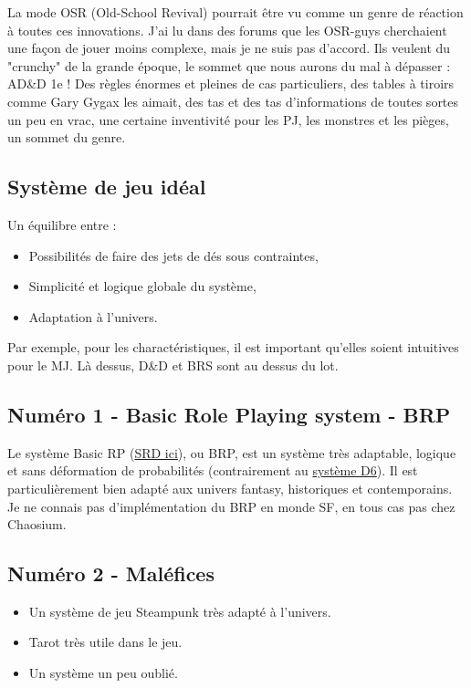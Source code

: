 \documentclass[a4paper, 11pt, twoside]{article}
\begin{document}
La mode OSR (Old-School Revival) pourrait être vu comme un genre de réaction à toutes ces innovations. J'ai lu dans des forums que les OSR-guys cherchaient une façon de jouer moins complexe, mais je ne suis pas d'accord. Ils veulent du "crunchy" de la grande époque, le sommet que nous aurons du mal à dépasser : AD\&D 1e ! Des règles énormes et pleines de cas particuliers, des tables à tiroirs comme Gary Gygax les aimait, des tas et des tas d'informations de toutes sortes un peu en vrac, une certaine inventivité pour les PJ, les monstres et les pièges, un sommet du genre.

\subsection{Système de jeu idéal}
\label{sec:org954ffbd}

Un équilibre entre :
\begin{itemize}
\item Possibilités de faire des jets de dés sous contraintes,
\item Simplicité et logique globale du système,
\item Adaptation à l'univers.
\end{itemize}

Par exemple, pour les charactéristiques, il est important qu'elles soient intuitives pour le MJ. Là dessus, D\&D et BRS sont au dessus du lot.

\subsection{Numéro 1 - Basic Role Playing system - BRP}
\label{sec:org5f9937e}

Le système Basic RP (\href{https://www.chaosium.com/brp-system-reference-document/}{SRD ici}), ou BRP, est un système très adaptable, logique et sans déformation de probabilités (contrairement au \href{https://github.com/orey/jdr/tree/master/D6-System}{système D6}). Il est particulièrement bien adapté aux univers fantasy, historiques et contemporains. Je ne connais pas d'implémentation du BRP en monde SF, en tous cas pas chez Chaosium.

\subsection{Numéro 2 - Maléfices}
\label{sec:orgd10a0cd}

\begin{itemize}
\item Un système de jeu Steampunk très adapté à l'univers.
\item Tarot très utile dans le jeu.
\item Un système un peu oublié.
\end{itemize}
\end{document}
